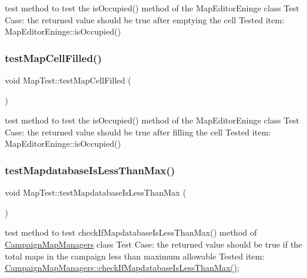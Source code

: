 test method to test the is\+Occupied() method of the Map\+Editor\+Eninge class Test Case\+: the returned value should be true after emptying the cell Tested item\+: Map\+Editor\+Eninge\+::is\+Occupied() \hypertarget{class_map_test_a07e1aa96435351d15809b880ff7a7efb}{}\label{class_map_test_a07e1aa96435351d15809b880ff7a7efb} 
\subsubsection{\texorpdfstring{test\+Map\+Cell\+Filled()}{testMapCellFilled()}}
{\footnotesize\ttfamily void Map\+Test\+::test\+Map\+Cell\+Filled (\begin{DoxyParamCaption}{ }\end{DoxyParamCaption})\hspace{0.3cm}{\ttfamily [protected]}}

test method to test the is\+Occupied() method of the Map\+Editor\+Eninge class Test Case\+: the returned value should be true after filling the cell Tested item\+: Map\+Editor\+Eninge\+::is\+Occupied() \hypertarget{class_map_test_afebfa18bc151eb842156e7b3db24f567}{}\label{class_map_test_afebfa18bc151eb842156e7b3db24f567} 
\subsubsection{\texorpdfstring{test\+Mapdatabase\+Is\+Less\+Than\+Max()}{testMapdatabaseIsLessThanMax()}}
{\footnotesize\ttfamily void Map\+Test\+::test\+Mapdatabase\+Is\+Less\+Than\+Max (\begin{DoxyParamCaption}{ }\end{DoxyParamCaption})\hspace{0.3cm}{\ttfamily [protected]}}

test method to test check\+If\+Mapdatabase\+Is\+Less\+Than\+Max() method of \hyperlink{class_campaign_map_managers}{Campaign\+Map\+Managers} class Test Case\+: the returned value should be true if the total maps in the campaign less than maximum allowable Tested item\+: \hyperlink{class_campaign_map_managers_ab68ada5bdef5137358cb80c0ad732b79}{Campaign\+Map\+Managers\+::check\+If\+Mapdatabase\+Is\+Less\+Than\+Max()}; \hypertarget{class_map_test_a35bb26a632d1d4926ef62a6871e5f3c9}{}\label{class_map_test_a35bb26a632d1d4926ef62a6871e5f3c9} 
